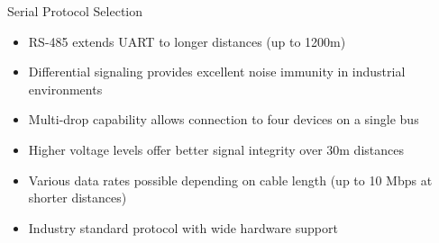 \begin{example2}{Serial Protocol Selection}
   \begin{itemize}
     \item RS-485 extends UART to longer distances (up to 1200m)
     \item Differential signaling provides excellent noise immunity in industrial environments
     \item Multi-drop capability allows connection to four devices on a single bus
     \item Higher voltage levels offer better signal integrity over 30m distances
     \item Various data rates possible depending on cable length (up to 10 Mbps at shorter distances)
     \item Industry standard protocol with wide hardware support
   \end{itemize}
\end{example2}
    
